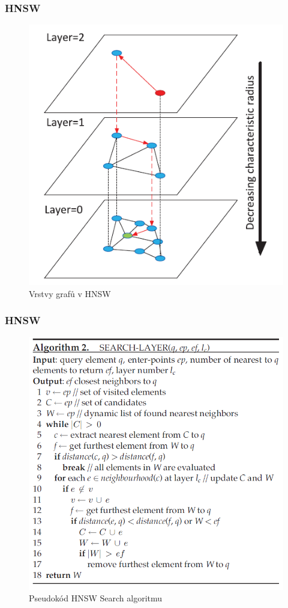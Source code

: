\documentclass{beamer}
\begin{document}
	\begin{frame}
		\frametitle{HNSW}
		
			\begin{figure}
			\includegraphics[scale=0.4]{figures/hnsw_layers.png}
			\caption{Vrstvy grafů v HNSW}
		\end{figure}
		
	\end{frame}

	\begin{frame}
		\frametitle{HNSW}
		
		\begin{figure}
			\includegraphics[scale=0.3]{figures/hnsw_search.png}
			\caption{Pseudokód HNSW Search algoritmu}
		\end{figure}
		
	\end{frame}
\end{document}
